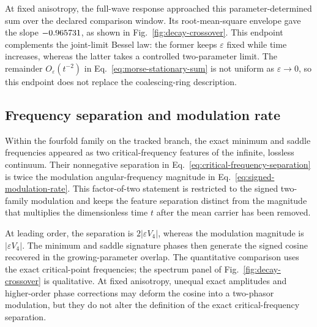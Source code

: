 At fixed anisotropy, the full-wave response approached this
parameter-determined sum over the declared comparison window.  Its
root-mean-square envelope gave the slope \(-0.965731\), as shown in
Fig.~\ref{fig:decay-crossover}.  This endpoint complements the joint-limit
Bessel law: the former keeps \(\varepsilon\) fixed while time increases,
whereas the latter takes a controlled two-parameter limit.  The remainder
\(O_\varepsilon(t^{-2})\) in Eq.~\eqref{eq:morse-stationary-sum} is not uniform
as \(\varepsilon\to0\), so this endpoint does not replace the coalescing-ring
description.

\subsection{Frequency separation and modulation rate}

Within the fourfold family on the tracked branch, the exact minimum and saddle
frequencies appeared as two critical-frequency features of the infinite,
lossless continuum.  Their nonnegative separation in
Eq.~\eqref{eq:critical-frequency-separation} is twice the modulation
angular-frequency magnitude in Eq.~\eqref{eq:signed-modulation-rate}.  This
factor-of-two statement is restricted to the signed two-family modulation and
keeps the feature separation distinct from the magnitude that multiplies the
dimensionless time \(t\)
after the mean carrier has been removed.

At leading order, the separation is \(2\lvert\varepsilon V_4\rvert\), whereas
the modulation magnitude is \(\lvert\varepsilon V_4\rvert\).  The minimum and
saddle signature phases then generate the signed cosine recovered in the
growing-parameter overlap.  The quantitative comparison uses the exact
critical-point frequencies; the spectrum panel of
Fig.~\ref{fig:decay-crossover} is qualitative.  At fixed anisotropy, unequal exact amplitudes and
higher-order phase corrections may deform the cosine into a two-phasor
modulation, but they do not alter the definition of the exact
critical-frequency separation.
